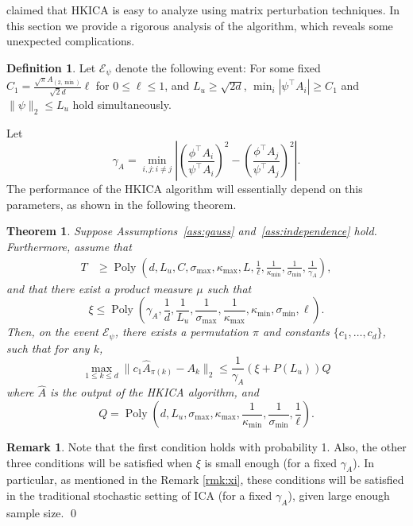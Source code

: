 \documentclass{article}
\newcommand{\Epsi}{\mathcal{E}_{\psi}}
\DeclareMathOperator{\pol}{Poly}
\newcommand{\poly}[1]{\pol\left(#1\right)}
\newtheorem{thm}[lemma]{Theorem}
\theoremstyle{definition}
\newtheorem{definition}[lemma]{Definition}
\newtheorem{remark}[lemma]{Remark}
\begin{document}
\citet{hsu2013learning} claimed that HKICA is easy to analyze using matrix perturbation techniques. In this section we provide a rigorous analysis of the algorithm, which reveals some unexpected complications.



\begin{definition}
Let $\Epsi$ denote the following event: For some fixed $C_1 = \frac{\sqrt{\pi}A_{(2,\min)}}{\sqrt{2}d} \ell$ for $0\le \ell\le 1$, and $ L_u \ge \sqrt{2d}$,
$\min_i |\psi^{\top}A_i| \ge C_1$ and $\|\psi\|_2 \le L_u$ hold simultaneously. 
\end{definition}
Let 
\begin{equation}
\label{def:kappa}
\gamma_A =  \min_{i,j: i\neq j} \left\vert \left(\frac{\phi^{\top}A_i}{\psi^{\top}A_i}\right)^2 - \left(\frac{\phi^{\top}A_j}{\psi^{\top}A_j}\right)^2 \right\vert. 
\end{equation}
The performance of the HKICA algorithm will essentially depend on this parameters, as shown in the following theorem.
\begin{thm}
 \label{thm:efficiency} 
Suppose Assumptions~\ref{ass:gauss} and~\ref{ass:independence} hold. 
Furthermore, assume that
\begin{align*}
T & \ge \poly{d, L_u, C, \sigma_{\max},\kappa_{\max}, L,\frac{1}{\ell}, \frac{1}{\kappa_{\min}}, \frac{1}{\sigma_{\min}}, \frac{1}{\gamma_A}},
\end{align*}
and that there exist a product measure $\mu$ such that 
\[
\xi \le \poly{\gamma_A, \frac{1}{d}, \frac{1}{L_u}, \frac{1}{\sigma_{\max}}, \frac{1}{\kappa_{\max}}, \kappa_{\min}, \sigma_{\min}, \ell}.
\] 
Then, on the event $\Epsi$, there exists a permutation $\pi$ and constants $\{c_1,\ldots,c_d\}$, such that for any $k$,
\begin{equation}
\label{eq:HKICA-bound}
  \max_{1\le k\le d}\| c_1\hat{A}_{\pi(k)} - A_k\|_2 \le
  \frac{1}{\gamma_A} (\xi + P(L_u))Q
\end{equation}
where $\hat{A}$ is the output of the HKICA algorithm, and 
\[Q=\poly{d, L_u, \sigma_{\max}, \kappa_{\max}, \frac{1}{\kappa_{\min}}, \frac{1}{\sigma_{\min}}, \frac{1}{\ell}}.\]
 \end{thm}
\begin{remark}
Note that the first condition holds with probability 1. Also, the other three conditions will be satisfied when $\xi$ is small enough (for a fixed $\gamma_A$).
In particular, as mentioned in the Remark \ref{rmk:xi}, these conditions will be satisfied in the traditional stochastic setting of ICA (for a fixed $\gamma_A$), given large enough sample size. \qed
\end{remark}
\end{document}
